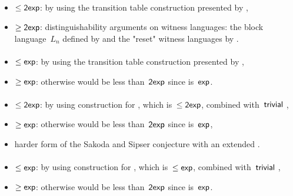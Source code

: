 \paragraph{\OLA{}\tto\ODFA}\label{cost:1LAto1DFA}
\begin{itemize}
	\item $\le\mathsf{2exp}$: by using the transition table construction presented by ,
	\item $\ge\mathsf{2exp}$: distinguishability arguments on witness languages: the block language~$L_n$ defined by  and the "reset" witness languages by .
\end{itemize}
\paragraph{\OLA{}\tto\ONFA}\label{cost:1LAto1NFA}
\begin{itemize}
	\item $\le\mathsf{exp}$: by using the transition table construction presented by ,
	\item $\ge\mathsf{exp}$: otherwise \hyperref[cost:1LAto1DFA]{\OLA{}\tto\ODFA} would be less than~$\mathsf{2exp}$ since \hyperref[cost:1NFAto1DFA]{\ONFA{}\tto\ODFA} is~$\mathsf{exp}$.
\end{itemize}
\paragraph{\OLA{}\tto\TDFA}
\begin{itemize}
	\item $\le\mathsf{2exp}$: by using construction for \hyperref[cost:1LAto1DFA]{\OLA{}\tto\ODFA}, which is~$\le\mathsf{2exp}$, combined with~$\mathsf{trivial}$ \ODFA{}\tto\TDFA,
	\item $\ge\mathsf{exp}$: otherwise \hyperref[cost:1LAto1DFA]{\OLA{}\tto\ODFA} would be less than~$\mathsf{2exp}$ since \hyperref[cost:2DFAto1DFA]{\TDFA{}\tto\ODFA} is~$\mathsf{exp}$,
	\item harder form of the Sakoda and Sipser conjecture with an extended \TNFA.
\end{itemize}
\paragraph{\OLA{}\tto\TNFA}
\begin{itemize}
	\item $\le\mathsf{exp}$: by using construction for \hyperref[cost:1LAto1NFA]{\OLA{}\tto\ONFA}, which is~$\le\mathsf{exp}$, combined with~$\mathsf{trivial}$ \ONFA{}\tto\TNFA,
	\item $\ge\mathsf{exp}$: otherwise \hyperref[cost:1LAto1DFA]{\OLA{}\tto\ODFA} would be less than~$\mathsf{2exp}$ since \TNFA{}\tto\ODFA is~$\mathsf{exp}$.
\end{itemize}

